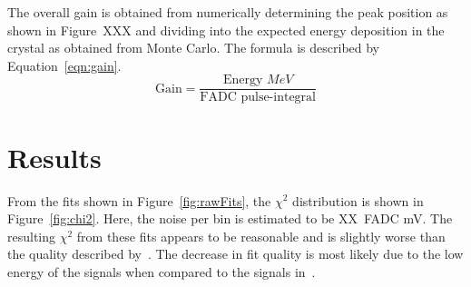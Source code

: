 \documentclass[twoside]{article}
\begin{document}
The overall gain is obtained from numerically determining the peak position as shown in Figure~XXX and dividing into the expected energy deposition in the crystal as obtained from Monte Carlo. The formula is described by Equation~\eqref{eqn:gain}.
\begin{equation}
  \textrm{Gain} = \dfrac{\textrm{Energy }MeV}{\textrm{FADC pulse-integral}}
  \label{eqn:gain}
\end{equation}

\section{Results}
From the fits shown in Figure~\ref{fig:rawFits}, the $\chi^2$ distribution is shown in Figure~\ref{fig:chi2}. Here, the noise per bin is estimated to be XX~FADC mV. The resulting $\chi^2$ from these fits appears to be reasonable and is slightly worse than the quality described by~\cite{baltzell_ecal_2015}. The decrease in fit quality is most likely due to the low energy of the signals when compared to the signals in~\cite{baltzell_ecal_2015}.
\end{document}
